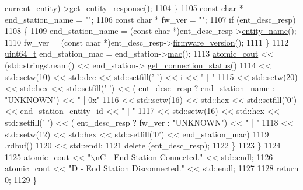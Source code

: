 \begin{DoxyCode}
      current\_entity)->\hyperlink{classavdecc__lib_1_1entity__descriptor_ac31dd117f0c931ae93c8ba52df7211bd}{get\_entity\_response}();
1104             \}
1105             \textcolor{keyword}{const} \textcolor{keywordtype}{char} * end\_station\_name = \textcolor{stringliteral}{""};
1106             \textcolor{keyword}{const} \textcolor{keywordtype}{char} * fw\_ver = \textcolor{stringliteral}{""};
1107             \textcolor{keywordflow}{if} (ent\_desc\_resp)
1108             \{
1109                 end\_station\_name = (\textcolor{keyword}{const} \textcolor{keywordtype}{char} *)ent\_desc\_resp->\hyperlink{classavdecc__lib_1_1entity__descriptor__response_a3abd11ceacbf37b685377f2b73a502ca}{entity\_name}();
1110                 fw\_ver = (\textcolor{keyword}{const} \textcolor{keywordtype}{char} *)ent\_desc\_resp->\hyperlink{classavdecc__lib_1_1entity__descriptor__response_a77abe180f1f91161e92abd718540e8ad}{firmware\_version}();
1111             \}
1112             \hyperlink{parse_8c_aec6fcb673ff035718c238c8c9d544c47}{uint64\_t} end\_station\_mac = end\_station->\hyperlink{classavdecc__lib_1_1end__station_a74d2328723e6f5ab7a275e3b0d4cf2a0}{mac}();
1113             \hyperlink{cmd__line_8h_a0bc38ccc65c79ba06c6fcd7b4bf554c3}{atomic\_cout} << (std::stringstream() << end\_station->
      \hyperlink{classavdecc__lib_1_1end__station_a0be4236753cbfd6dc2f23c9f96ca61bc}{get\_connection\_status}()
1114                                                 << std::setw(10) << std::dec << std::setfill(\textcolor{charliteral}{' '}) << i << \textcolor{stringliteral}{"
        |  "}
1115                                                 << std::setw(20) << std::hex << std::setfill(\textcolor{charliteral}{' '}) << (
      ent\_desc\_resp ? end\_station\_name : \textcolor{stringliteral}{"UNKNOWN"}) << \textcolor{stringliteral}{"  |  0x"}
1116                                                 << std::setw(16) << std::hex << std::setfill(\textcolor{charliteral}{'0'}) << 
      end\_station\_entity\_id << \textcolor{stringliteral}{"  |  "}
1117                                                 << std::setw(16) << std::hex << std::setfill(\textcolor{charliteral}{' '}) << (
      ent\_desc\_resp ? fw\_ver : \textcolor{stringliteral}{"UNKNOWN"}) << \textcolor{stringliteral}{"  |  "}
1118                                                 << std::setw(12) << std::hex << std::setfill(\textcolor{charliteral}{'0'}) << 
      end\_station\_mac)
1119                                .rdbuf()
1120                         << std::endl;
1121             \textcolor{keyword}{delete} (ent\_desc\_resp);
1122         \}
1123     \}
1124 
1125     \hyperlink{cmd__line_8h_a0bc38ccc65c79ba06c6fcd7b4bf554c3}{atomic\_cout} << \textcolor{stringliteral}{"\(\backslash\)nC - End Station Connected."} << std::endl;
1126     \hyperlink{cmd__line_8h_a0bc38ccc65c79ba06c6fcd7b4bf554c3}{atomic\_cout} << \textcolor{stringliteral}{"D - End Station Disconnected."} << std::endl;
1127 
1128     \textcolor{keywordflow}{return} 0;
1129 \}
\end{DoxyCode}



